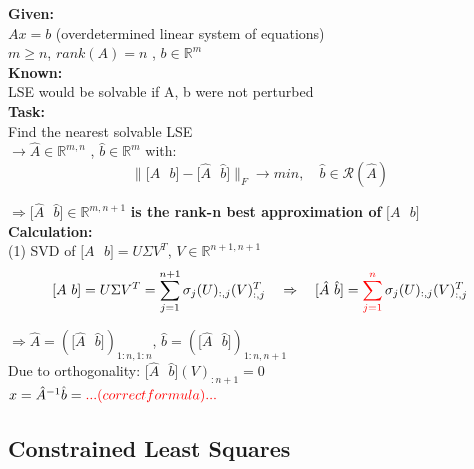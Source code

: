 \documentclass[12pt, a4paper]{article}
\newcommand{\R}{\mathbb{R}}
\begin{document}
\begin{tcolorbox}
\textbf{Given:}\\
$Ax = b$ (overdetermined linear system of equations) \\
$m \geq n$, $rank(A)=n$ ,  $b \in \R^{m}$\vspace{2mm}\\
\textbf{Known:}  \\
LSE would be solvable if A, b were not perturbed  \vspace{2mm}\\
\textbf{Task:} \\
Find the nearest solvable LSE \\
$\rightarrow  \hat A \in \R^{m,n}$ ,  $\hat b \in \R^{m}$ with: \\
\[ \lVert \lbrack A \text{ }b \rbrack - \lbrack \hat A \text{ } \hat b \rbrack\rVert_{F} \rightarrow min, \quad \hat b \in \mathcal{R}(\hat A) \] 
\end{tcolorbox}


$\Rightarrow \lbrack \hat A \text{ } \hat b \rbrack \in \R^{m, n+1}$ \textbf{is the rank-n best approximation of}  $\lbrack A \text{ }b \rbrack$ \\

\textbf{Calculation:} \\
(1) SVD of $\lbrack A \text{ }b \rbrack = U \Sigma V^{T}$, \quad \quad $V \in \R^{n+1, n+1}$ \\
\[ \lbrack A \text{ }b \rbrack =  U \Sigma V^{T} = \sum_{j=1}^{n+1} \sigma_j (U)_{:,j} (V)_{:,j}^{T} \quad \Rightarrow \quad  \lbrack \hat A \text{ } \hat b \rbrack = \color{red}\sum_{j=1}^{n} \color{black}\sigma_j (U)_{:,j} (V)_{:,j}^{T} \]
\begin{center}
$\Rightarrow \hat A = (\lbrack \hat A \text{ } \hat b \rbrack )_{1:n, 1:n}$, \quad $\hat b = (\lbrack \hat A \text{ } \hat b \rbrack )_{1:n, n+1}$ \vspace{2mm}\\
	Due to orthogonality: $\lbrack \hat A \text{ } \hat b \rbrack (V)_{:n+1} = 0$
	\vspace{10mm}\\

	$x = \hat A^{-1} \hat b =\color{red} ... (correct formula)...$
 
\end{center}


\subsection{Constrained Least Squares}
\end{document}
